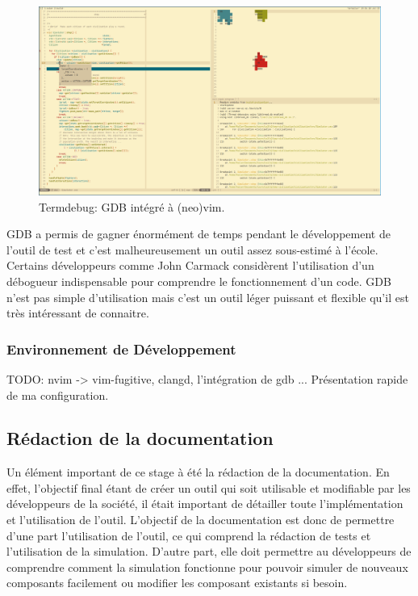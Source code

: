 \documentclass[a4paper]{article}
\begin{document}
\begin{figure}[h!]
  \begin{center}
  \includegraphics[scale=0.2]{./img/termdebug.png}
    \caption{Termdebug: GDB intégré à (neo)vim.}
  \end{center}
  \label{fig:termdebug}
\end{figure}

GDB a permis de gagner énormément de temps pendant le développement de l'outil
de test et c'est malheureusement un outil assez sous-estimé à l'école. Certains
développeurs comme John Carmack considèrent l'utilisation d'un débogueur
indispensable pour comprendre le fonctionnement d'un code. GDB n'est pas simple
d'utilisation mais c'est un outil léger puissant et flexible qu'il est très
intéressant de connaitre.
\subsubsection{Environnement de Développement}%

TODO: nvim -> vim-fugitive, clangd, l'intégration de gdb ... Présentation rapide
de ma configuration.
\subsection{Rédaction de la documentation}%

Un élément important de ce stage à été la rédaction de la documentation. En
effet, l'objectif final étant de créer un outil qui soit utilisable et
modifiable par les développeurs de la société, il était important de détailler
toute l'implémentation et l'utilisation de l'outil. L'objectif de la
documentation est donc de permettre d'une part l'utilisation de l'outil, ce qui
comprend la rédaction de tests et l'utilisation de la simulation. D'autre part,
elle doit permettre au développeurs de comprendre comment la simulation
fonctionne pour pouvoir simuler de nouveaux composants facilement ou modifier
les composant existants si besoin.
\end{document}
